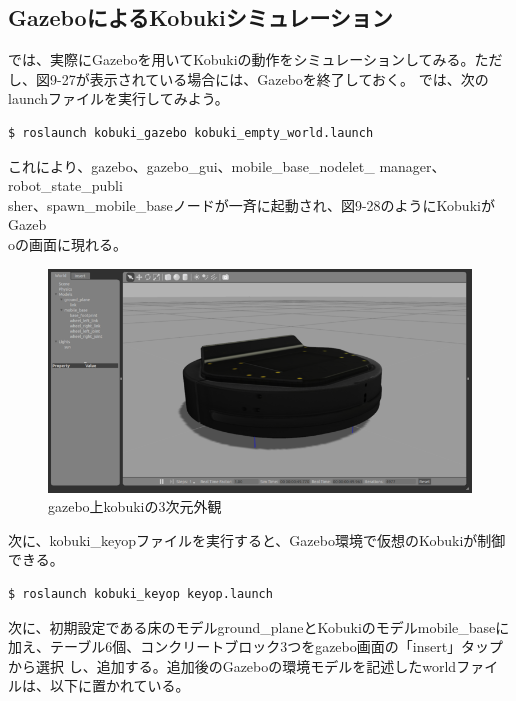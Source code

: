 \begin{itemize}
\subsection{GazeboによるKobukiシミュレーション}

では、実際にGazeboを用いてKobukiの動作をシミュレーションしてみる。ただし、図9-27が表示されている場合には、Gazeboを終了しておく。 では、次のlaunchファイルを実行してみよう。

\begin{lstlisting}[language=ROS]
$ roslaunch kobuki_gazebo kobuki_empty_world.launch
\end{lstlisting}

これにより、gazebo、gazebo\_gui、mobile\_base\_nodelet\_ manager、robot\_state\_publi\\sher、spawn\_mobile\_baseノードが一斉に起動され、図9-28のようにKobukiがGazeb\\oの画面に現れる。

\begin{figure}[htp]
  \centering
  \includegraphics[width=15cm]{pictures/chapter9/pic_09_28.png}
  \caption{gazebo上kobukiの3次元外観}
\end{figure}

次に、kobuki\_keyopファイルを実行すると、Gazebo環境で仮想のKobukiが制御できる。

\begin{lstlisting}[language=ROS]
$ roslaunch kobuki_keyop keyop.launch
\end{lstlisting}

次に、初期設定である床のモデルground\_planeとKobukiのモデルmobile\_baseに加え、テーブル6個、コンクリートブロック3つをgazebo画面の「insert」タップから選択   し、追加する。追加後のGazeboの環境モデルを記述したworldファイルは、以下に置かれている。


\end{itemize}
